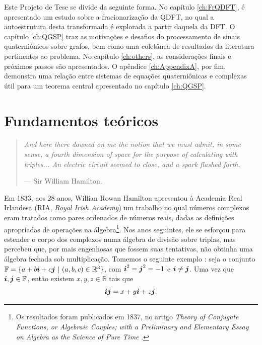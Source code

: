 Este Projeto de Tese se divide da seguinte forma. No cap\'itulo \ref{ch:FrQDFT}, \'e apresentado um estudo sobre a fracionariza\c c\~ao da QDFT, no qual a autoestrutura desta transformada \'e explorada a partir daquela da DFT. O cap\'itulo \ref{ch:QGSP} traz as motiva\c c\~oes e desafios do processamento de sinais quaterni\^onicos sobre grafos, bem como uma colet\^anea de resultados da literatura pertinentes ao problema. No cap\'itulo \ref{ch:others}, as considera\c c\~oes finais e pr\'oximos passos s\~ao apresentados. O ap\^endice \ref{ch:AppendixA}, por fim, demonstra uma rela\c c\~ao entre sistemas de equa\c c\~oes quaterni\^onicas e complexas \'util para um teorema central apresentado no cap\'itulo \ref{ch:QGSP}.


\chapter{Fundamentos te\'oricos}
\label{ch:fundamentos}

\begin{quotation}
\itshape
And here there dawned on me the notion that we must admit, in some sense, a fourth dimension of space for the purpose of calculating with triples... An electric circuit seemed to close, and a spark flashed forth.

\noindent --- Sir William Hamilton.
\end{quotation}


Em 1833, aos 28 anos, Willian Rowan Hamilton apresentou \`a Academia Real Irlandesa (RIA, \emph{Royal Irish Academy}) um trabalho no qual n\'umeros complexos eram tratados como pares ordenados de n\'umeros reais, dadas as defini\c c\~oes apropriadas de opera\c c\~oes na \'algebra\footnote{Os resultados foram publicados em 1837, no artigo \emph{Theory of Conjugate Functions, or Algebraic Couples; with a Preliminary and Elementary Essay on Algebra as the Science of Pure Time} \cite{hamilton1837theory}.}. Nos anos seguintes, ele se esfor\c cou para estender o corpo dos complexos numa \'algebra de divis\~ao sobre triplas, mas percebeu que, por mais engenhosas que fossem suas tentativas, n\~ao obtinha uma \'algebra fechada sob multiplica\c c\~ao. Tomemos o seguinte exemplo \cite{santos2011algebra}: seja o conjunto $\mathbb{F} = \{ a + b \boldsymbol{i} + c \boldsymbol{j}  \ | \ (a, b, c) \in \mathbb{R}^3\}$, com $\boldsymbol{i}^2 = \boldsymbol{j}^2 = -1$ e $\boldsymbol{i} \neq \boldsymbol{j}$. Uma vez que $\boldsymbol{i}, \boldsymbol{j} \in \mathbb{F}$, ent\~ao existem $x, y, z \in \mathbb{R}$ tais que
\begin{equation}
\boldsymbol{i} \boldsymbol{j} = x + y \boldsymbol{i} + z \boldsymbol{j}.
\label{eq:demonstration01}
\end{equation}

